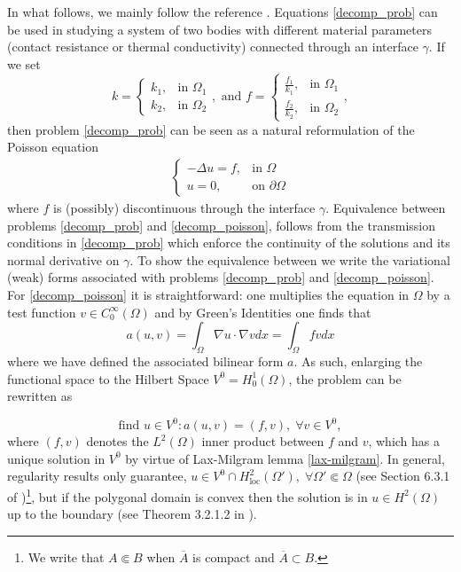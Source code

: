 In what follows, we mainly follow the reference \cite{quarteroni1999domain}. Equations \eqref{decomp_prob} can be used in studying a system of two bodies with different material parameters (contact resistance or thermal conductivity) connected through an interface \(\gamma\). If we set
\[
k = \begin{cases}
    k_1,& \text{in } \Omega_1\\
    k_2,& \text{in } \Omega_2
\end{cases}, \text{ and }
f = \begin{cases}
    \frac{f_1}{k_1},& \text{in } \Omega_1\\
    \frac{f_2}{k_2},& \text{in } \Omega_2
\end{cases},   
\]
then problem \eqref{decomp_prob} can be seen as a natural reformulation of the Poisson equation
\begin{align}\label{decomp_poisson}
    \begin{cases}
        -\Delta u = f, & \text{in }\Omega \\
        u = 0, & \text{on } \partial\Omega
    \end{cases}
\end{align}
where \(f\) is (possibly) discontinuous through the interface \(\gamma\). Equivalence between problems \eqref{decomp_prob} and \eqref{decomp_poisson}, follows from the transmission conditions in \eqref{decomp_prob} which enforce the continuity of the solutions and its normal derivative on \(\gamma\). To show the equivalence between we write the variational (weak) forms associated with problems \eqref{decomp_prob} and \eqref{decomp_poisson}. For \eqref{decomp_poisson} it is straightforward: one multiplies the equation in \(\Omega\) by a test function \(v \in C^\infty_0(\Omega)\) and by Green's Identities one finds that
\[
a(u,v)=\int_\Omega \nabla u \cdot \nabla v dx = \int_\Omega f v dx
\]
where we have defined the associated bilinear form \(a\). As such, enlarging the functional space to the Hilbert Space \(V^0=H^1_0(\Omega)\), the problem can be rewritten as

\begin{equation}\label{weak_poisson}
    \text{find } u \in V^0: a(u,v) = (f, v), \; \forall v \in V^0,   
\end{equation}
where \((f,v)\) denotes the \(L^2(\Omega)\) inner product between \(f\) and \(v\), which has a unique solution in \(V^0\) by virtue of Lax-Milgram lemma \ref{lax-milgram}. In general, regularity results only guarantee, \(u \in V^0 \cap H^2_{\text{loc}}(\Omega'), \; \forall \Omega' \Subset \Omega\) (see Section 6.3.1 of \cite{evans2022partial})\footnote{We write that \(A \Subset B\) when \(\overline{A}\) is compact and \(\overline{A} \subset B\).}, but if the polygonal domain is convex then the solution is in \(u \in H^2(\Omega)\) up to the boundary (see Theorem 3.2.1.2 in \cite{grisvard2011elliptic}). 

